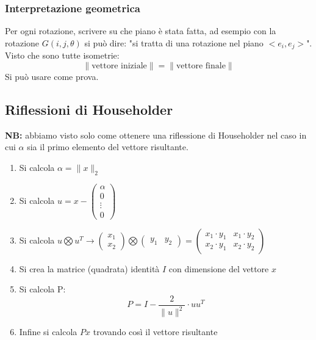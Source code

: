 \documentclass[10pt]{article}
\begin{document}
\subsubsection{Interpretazione geometrica}
Per ogni rotazione, scrivere su che piano è stata fatta, ad esempio con la rotazione $G(i,j,\theta)$ si può dire: "si tratta di una rotazione nel piano $<e_{i},e_{j}>$". Visto che sono tutte isometrie: \begin{equation*}
    \lVert \text{vettore iniziale} \rVert = \lVert \text{vettore finale} \rVert
\end{equation*}
Si può usare come prova.
\subsection{Riflessioni di Householder}
\textbf{NB:} abbiamo visto solo come ottenere una riflessione di Householder nel caso in cui $\alpha$ sia il primo elemento del vettore risultante.
\begin{enumerate}
    \item Si calcola $\alpha=\lVert x\rVert_{2}$
    \item Si calcola $u=x-\begin{pmatrix}
        \alpha \\ 0 \\ \vdots \\ 0
    \end{pmatrix}$
    \item Si calcola $u\bigotimes u^{T} \rightarrow \begin{pmatrix}
        x_{1} \\ x_{2}
    \end{pmatrix}\bigotimes\begin{pmatrix}
        y_{1} & y_{2}
    \end{pmatrix}=\begin{pmatrix}
        x_{1}\cdot y_{1} & x_{1}\cdot y_{2} \\
        x_{2}\cdot y_{1} & x_{2}\cdot y_{2}
    \end{pmatrix}$
    \item Si crea la matrice (quadrata) identità $I$ con dimensione del vettore $x$ 
    \item Si calcola P: \begin{equation*}
        P = I-\frac{2}{\lVert u\rVert^{2}}\cdot uu^{T}
    \end{equation*}
    \item Infine si calcola $Px$ trovando così il vettore risultante
\end{enumerate}
\end{document}
